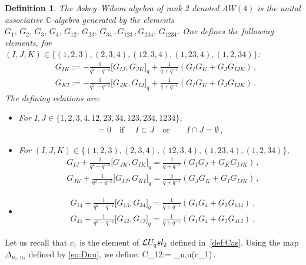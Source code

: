 \documentclass[11pt]{amsart}
\numberwithin{equation}{section}
\newtheorem{defn}[thm]{Definition}
\numberwithin{equation}{section}
\begin{document}
\begin{defn}
The Askey--Wilson algebra of rank 2 denoted $AW(4)$ is the unital associative ${\mathbb C}$-algebra generated by the elements  $G_1,\, G_2,\, G_3,\, G_4,\,G_{12},\, G_{23},\, G_{34}\,, G_{123}\,,G_{234},\,G_{1234}$. One defines the following elements, for $(I,J,K)\in\{(1,2,3),(2,3,4),(12,3,4),(1,23,4),(1,2,34)\}$:
\begin{align}
   & G_{IK}:=-\frac{1}{q^2-q^{-2}}\lbrack G_{IJ},G_{JK} \rbrack_q +\frac{1}{q+q^{-1}}(G_IG_K+G_JG_{IJK})\,,\\
    & G_{KI}:=-\frac{1}{q^2-q^{-2}}\lbrack G_{JK},G_{IJ} \rbrack_q +\frac{1}{q+q^{-1}}(G_IG_K+G_JG_{IJK})\,.
\end{align}
The defining relations are:
\begin{itemize}
    \item For $I,J\in\{1,2,3,4,12,23,34,123,234,1234\}$,
    \begin{align}
        [G_I,G_J]=0\quad\text{if }\quad I\subset J\quad\text{or}\qquad  I\cap J=\emptyset\,,
    \end{align}
    \item For $(I,J,K)\in\{(1,2,3),(2,3,4),(12,3,4),(1,23,4),(1,2,34)\}$,
    \begin{align}
        &G_{IJ}+	\frac{1}{q^2-q^{-2}} \lbrack G_{JK}, G_{IK}\rbrack_q   =\frac{1}{q+q^{-1}}(G_{I}G_{J}+G_{K}G_{IJK})\,,\\
       & G_{JK}+	\frac{1}{q^2-q^{-2}} \lbrack G_{IJ}, G_{KI}\rbrack_q   =\frac{1}{q+q^{-1}}(G_{J}G_{K}+G_{I}G_{IJK})\,, 
    \end{align}
    \item\begin{align}
&G_{14}+	\frac{1}{q^2-q^{-2}} \lbrack G_{13}, G_{34}\rbrack_q   =\frac{1}{q+q^{-1}}(G_{1}G_{4}+G_{3}G_{134}) \ , \label{AW43}\\
&G_{41}+	\frac{1}{q^2-q^{-2}} \lbrack G_{42}, G_{12}\rbrack_q   =\frac{1}{q+q^{-1}}(G_{1}G_{4}+G_{2}G_{412}) \ , \label{AW44}
\end{align} 
\end{itemize}
\end{defn}

Let us recall that 
 $c_1$ is the element of $\mathcal{L} U_q sl_2$ defined in~\eqref{def:Cas}. Using the map $\Delta_{u_1,u_2}$ defined by \eqref{eq:Duu}, we define:
\beqa
{C}_{12}:= {\Delta}_{u,u}(c_1)\,.
\eeqa
\end{document}
